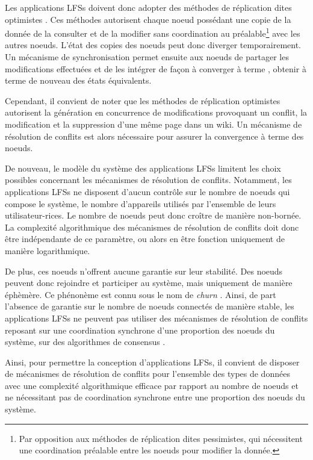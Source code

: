 Les applications \acp{LFS} doivent donc adopter des méthodes de réplication dites optimistes \cite{2005-optimistic-replication-saito}.
Ces méthodes autorisent chaque noeud possédant une copie de la donnée de la consulter et de la modifier sans coordination au préalable\footnote{Par opposition aux méthodes de réplication dites pessimistes, \ie qui nécessitent une coordination préalable entre les noeuds pour modifier la donnée.} avec les autres noeuds.
L'état des copies des noeuds peut donc diverger temporairement.
Un mécanisme de synchronisation permet ensuite aux noeuds de partager les modifications effectuées et de les intégrer de façon à converger à terme \cite{10.1145/224057.224070}, \ie obtenir à terme de nouveau des états équivalents.

Cependant, il convient de noter que les méthodes de réplication optimistes autorisent la génération en concurrence de modifications provoquant un conflit, \eg la modification et la suppression d'une même page dans un wiki.
Un mécanisme de résolution de conflits est alors nécessaire pour assurer la convergence à terme des noeuds.

De nouveau, le modèle du système des applications \acp{LFS} limitent les choix possibles concernant les mécanismes de résolution de conflits.
Notamment, les applications \acp{LFS} ne disposent d'aucun contrôle sur le nombre de noeuds qui compose le système, \ie le nombre d'appareils utilisés par l'ensemble de leurs utilisateur-rices.
Le nombre de noeuds peut donc croître de manière non-bornée.
La complexité algorithmique des mécanismes de résolution de conflits doit donc être indépendante de ce paramètre, ou alors en être fonction uniquement de manière logarithmique.

De plus, ces noeuds n'offrent aucune garantie sur leur stabilité.
Des noeuds peuvent donc rejoindre et participer au système, mais uniquement de manière éphèmère.
Ce phénonème est connu sous le nom de \emph{churn} \cite{understandingChurnP2PNetworks2006}.
Ainsi, de part l'absence de garantie sur le nombre de noeuds connectés de manière stable, les applications \acp{LFS} ne peuvent pas utiliser des mécanismes de résolution de conflits reposant sur une coordination synchrone d'une proportion des noeuds du système, \ie sur des algorithmes de consensus \cite{1998-paxos-lamport, 2014-raft-ongaro}.

Ainsi, pour permettre la conception d'applications \acp{LFS}, il convient de disposer de mécanismes de résolution de conflits pour l'ensemble des types de données avec une complexité algorithmique efficace par rapport au nombre de noeuds et ne nécessitant pas de coordination synchrone entre une proportion des noeuds du système.


